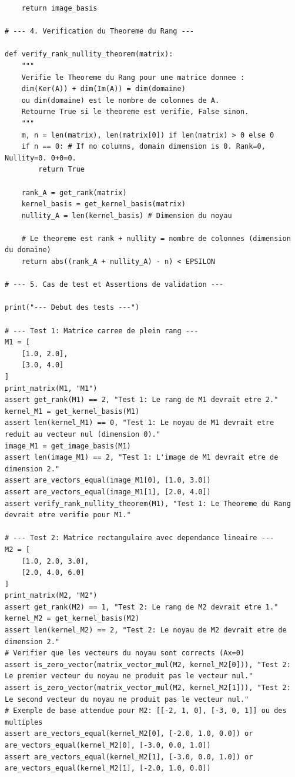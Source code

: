 \documentclass{report}
\begin{document}
\begin{verbatim}
    return image_basis

# --- 4. Verification du Theoreme du Rang ---

def verify_rank_nullity_theorem(matrix):
    """
    Verifie le Theoreme du Rang pour une matrice donnee :
    dim(Ker(A)) + dim(Im(A)) = dim(domaine)
    ou dim(domaine) est le nombre de colonnes de A.
    Retourne True si le theoreme est verifie, False sinon.
    """
    m, n = len(matrix), len(matrix[0]) if len(matrix) > 0 else 0
    if n == 0: # If no columns, domain dimension is 0. Rank=0, Nullity=0. 0+0=0.
        return True

    rank_A = get_rank(matrix)
    kernel_basis = get_kernel_basis(matrix)
    nullity_A = len(kernel_basis) # Dimension du noyau

    # Le theoreme est rank + nullity = nombre de colonnes (dimension du domaine)
    return abs((rank_A + nullity_A) - n) < EPSILON

# --- 5. Cas de test et Assertions de validation ---

print("--- Debut des tests ---")

# --- Test 1: Matrice carree de plein rang ---
M1 = [
    [1.0, 2.0],
    [3.0, 4.0]
]
print_matrix(M1, "M1")
assert get_rank(M1) == 2, "Test 1: Le rang de M1 devrait etre 2."
kernel_M1 = get_kernel_basis(M1)
assert len(kernel_M1) == 0, "Test 1: Le noyau de M1 devrait etre reduit au vecteur nul (dimension 0)."
image_M1 = get_image_basis(M1)
assert len(image_M1) == 2, "Test 1: L'image de M1 devrait etre de dimension 2."
assert are_vectors_equal(image_M1[0], [1.0, 3.0])
assert are_vectors_equal(image_M1[1], [2.0, 4.0])
assert verify_rank_nullity_theorem(M1), "Test 1: Le Theoreme du Rang devrait etre verifie pour M1."

# --- Test 2: Matrice rectangulaire avec dependance lineaire ---
M2 = [
    [1.0, 2.0, 3.0],
    [2.0, 4.0, 6.0]
]
print_matrix(M2, "M2")
assert get_rank(M2) == 1, "Test 2: Le rang de M2 devrait etre 1."
kernel_M2 = get_kernel_basis(M2)
assert len(kernel_M2) == 2, "Test 2: Le noyau de M2 devrait etre de dimension 2."
# Verifier que les vecteurs du noyau sont corrects (Ax=0)
assert is_zero_vector(matrix_vector_mul(M2, kernel_M2[0])), "Test 2: Le premier vecteur du noyau ne produit pas le vecteur nul."
assert is_zero_vector(matrix_vector_mul(M2, kernel_M2[1])), "Test 2: Le second vecteur du noyau ne produit pas le vecteur nul."
# Exemple de base attendue pour M2: [[-2, 1, 0], [-3, 0, 1]] ou des multiples
assert are_vectors_equal(kernel_M2[0], [-2.0, 1.0, 0.0]) or are_vectors_equal(kernel_M2[0], [-3.0, 0.0, 1.0])
assert are_vectors_equal(kernel_M2[1], [-3.0, 0.0, 1.0]) or are_vectors_equal(kernel_M2[1], [-2.0, 1.0, 0.0])


\end{verbatim}
\end{document}

